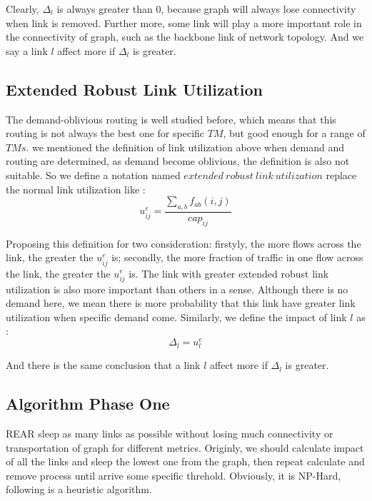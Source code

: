 \documentclass[conference]{IEEEtran}
\begin{document}
Clearly, $\Delta_l$ is always greater than 0, because graph will always lose connectivity when link is removed.
Further more, some link will play a more important role in the connectivity of graph, such as the backbone link 
of network topology. And we say a link $l$ affect more if $\Delta_l$ is greater.

\subsection{Extended Robust Link Utilization}
The demand-oblivious routing is well studied before, which means that this routing is not always the best one for 
specific $TM$, but good enough for a range of $TMs$. we mentioned the definition of link utilization above when 
demand and routing are determined, as demand become oblivious, the definition is also not suitable. So we define
a notation named $extended\ robust\ link\ utilization$ replace the normal link utilization like :
\begin{equation}
	u^e_{ij} = \frac {\sum_{a,b}f_{ab}(i,j)} {cap_{ij}}
\end{equation}


Proposing this definition for two consideration: firstyly, the more flows across the link, the greater the $u^e_{ij}$ is;
secondly, the more fraction of traffic in one flow across the link, the greater the $u^e_{ij}$ is. The link with greater
extended robust link utilization is also more important than others in a sense. Although there is no demand here, we mean
there is more probability that this link have greater link utilization when specific demand come. Similarly, we define 
the impact of link $l$ as :
\begin{equation}
    \Delta_l = u^e_{l}
\end{equation}

And there is the same conclusion that a link $l$ affect more if $\Delta_l$ is greater.


\subsection{Algorithm Phase One}
REAR sleep as many links as possible without losing much connectivity or transportation of graph for different metrics. 
Originly,  we should calculate impact of all the links and sleep the lowest one from the graph, then repeat calculate and remove
process until arrive some specific threhold. Obviously, it is NP-Hard, following is a heuristic algorithm.
\end{document}
